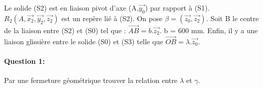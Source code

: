 Le solide (S2) est en liaison pivot d'axe (A,$\overrightarrow{y_0}$) par rapport à (S1). $R_2(A,\overrightarrow{x_2},\overrightarrow{y_2},\overrightarrow{z_2})$ est un repère lié à (S2). On pose $\beta=(\overrightarrow{z_0},\overrightarrow{z_2})$. Soit B le centre de la liaison entre (S2) et (S0) tel que : $\overrightarrow{AB}=b.\overrightarrow{z_2}$. b = 600 mm.
Enfin, il y a une liaison glissière entre le solide (S0) et (S3) telle que $\overrightarrow{OB}=\lambda.\overrightarrow{z_0}$.

\paragraph{Question 1:}

Par une fermeture géométrique trouver la relation entre $\lambda$ et $\gamma$.

